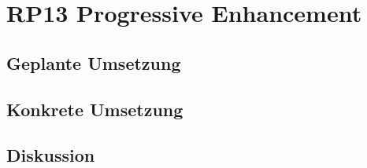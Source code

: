 \section{RP13 Progressive Enhancement}
\label{sec:principle-rp13-progressive-enhancement}

\subsection*{Geplante Umsetzung}


\subsection*{Konkrete Umsetzung}


\subsection*{Diskussion}
